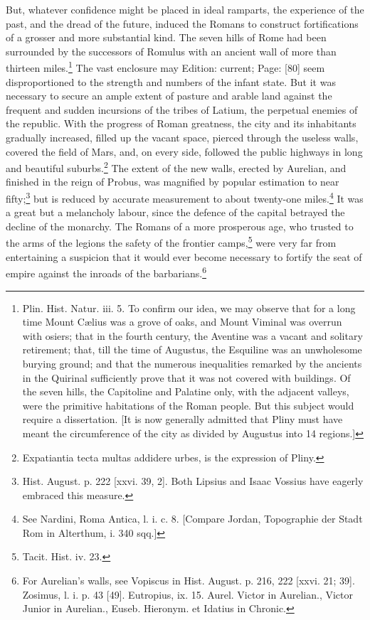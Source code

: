 But, whatever confidence might be placed in ideal ramparts, the experience of the past, and the dread of the future, induced the Romans to construct fortifications of a grosser and more substantial kind. The seven hills of Rome had been surrounded by the successors of Romulus with an ancient wall of more than thirteen miles.\footnote{Plin. Hist. Natur. iii. 5. To confirm our idea, we may observe that for a long time Mount Cælius was a grove of oaks, and Mount Viminal was overrun with osiers; that in the fourth century, the Aventine was a vacant and solitary retirement; that, till the time of Augustus, the Esquiline was an unwholesome burying ground; and that the numerous inequalities remarked by the ancients in the Quirinal sufficiently prove that it was not covered with buildings. Of the seven hills, the Capitoline and Palatine only, with the adjacent valleys, were the primitive habitations of the Roman people. But this subject would require a dissertation. [It is now generally admitted that Pliny must have meant the circumference of the city as divided by Augustus into 14 regions.]} The vast enclosure may Edition: current; Page: [80] seem disproportioned to the strength and numbers of the infant state. But it was necessary to secure an ample extent of pasture and arable land against the frequent and sudden incursions of the tribes of Latium, the perpetual enemies of the republic. With the progress of Roman greatness, the city and its inhabitants gradually increased, filled up the vacant space, pierced through the useless walls, covered the field of Mars, and, on every side, followed the public highways in long and beautiful suburbs.\footnote{Expatiantia tecta multas addidere urbes, is the expression of Pliny.} The extent of the new walls, erected by Aurelian, and finished in the reign of Probus, was magnified by popular estimation to near fifty;\footnote{Hist. August. p. 222 [xxvi. 39, 2]. Both Lipsius and Isaac Vossius have eagerly embraced this measure.} but is reduced by accurate measurement to about twenty-one miles.\footnote{See Nardini, Roma Antica, l. i. c. 8. [Compare Jordan, Topographie der Stadt Rom in Alterthum, i. 340 sqq.]} It was a great but a melancholy labour, since the defence of the capital betrayed the decline of the monarchy. The Romans of a more prosperous age, who trusted to the arms of the legions the safety of the frontier camps,\footnote{Tacit. Hist. iv. 23.} were very far from entertaining a suspicion that it would ever become necessary to fortify the seat of empire against the inroads of the barbarians.\footnote{For Aurelian\texthebrew{}’s walls, see Vopiscus in Hist. August. p. 216, 222 [xxvi. 21; 39]. Zosimus, l. i. p. 43 [49]. Eutropius, ix. 15. Aurel. Victor in Aurelian., Victor Junior in Aurelian., Euseb. Hieronym. et Idatius in Chronic.}

